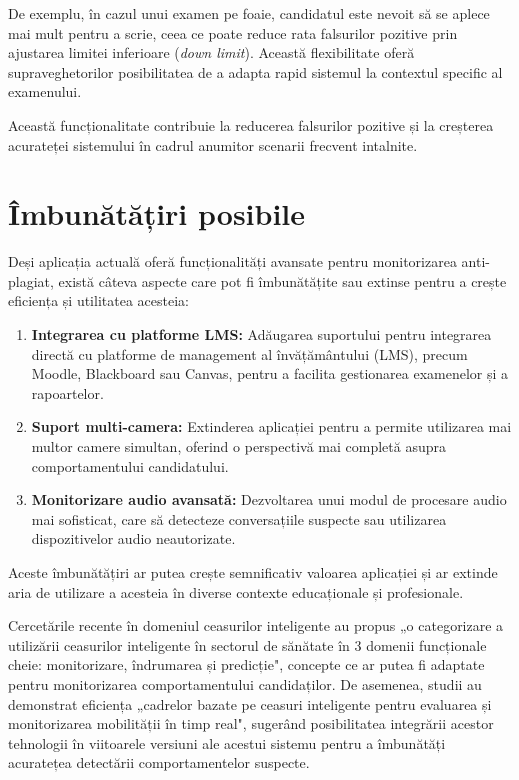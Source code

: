 \documentclass[12pt,a4paper]{article}
\begin{document}
De exemplu, în cazul unui examen pe foaie, candidatul este nevoit să se aplece mai mult pentru a scrie, ceea ce poate reduce rata falsurilor pozitive prin ajustarea limitei inferioare (\textit{down limit}). Această flexibilitate oferă supraveghetorilor posibilitatea de a adapta rapid sistemul la contextul specific al examenului.

Această funcționalitate contribuie la reducerea falsurilor pozitive și la creșterea acurateței sistemului în cadrul anumitor scenarii frecvent intalnite.

\section{Îmbunătățiri posibile}

Deși aplicația actuală oferă funcționalități avansate pentru monitorizarea anti-plagiat, există câteva aspecte care pot fi îmbunătățite sau extinse pentru a crește eficiența și utilitatea acesteia:

\begin{enumerate}
    \item \textbf{Integrarea cu platforme LMS:} Adăugarea suportului pentru integrarea directă cu platforme de management al învățământului (LMS), precum Moodle, Blackboard sau Canvas, pentru a facilita gestionarea examenelor și a rapoartelor.

    \item \textbf{Suport multi-camera:} Extinderea aplicației pentru a permite utilizarea mai multor camere simultan, oferind o perspectivă mai completă asupra comportamentului candidatului.

    \item \textbf{Monitorizare audio avansată:} Dezvoltarea unui modul de procesare audio mai sofisticat, care să detecteze conversațiile suspecte sau utilizarea dispozitivelor audio neautorizate.

\end{enumerate}

Aceste îmbunătățiri ar putea crește semnificativ valoarea aplicației și ar extinde aria de utilizare a acesteia în diverse contexte educaționale și profesionale.

Cercetările recente în domeniul ceasurilor inteligente au propus „o categorizare a utilizării ceasurilor 
inteligente în sectorul de sănătate în 3 domenii funcționale cheie: monitorizare, îndrumarea și 
predicție"\cite{smartwatch_framework}, concepte ce ar putea fi adaptate pentru monitorizarea 
comportamentului candidaților. De asemenea, studii au demonstrat eficiența „cadrelor bazate pe ceasuri 
inteligente pentru evaluarea și monitorizarea mobilității în timp real"\cite{smartwatch_monitoring}, 
sugerând posibilitatea integrării acestor tehnologii în viitoarele versiuni ale acestui sistemu pentru 
a îmbunătăți acuratețea detectării comportamentelor suspecte.
\end{document}
